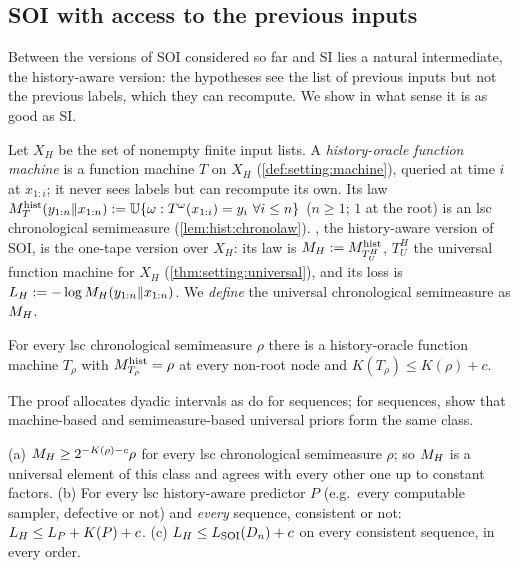 \subsection{SOI with access to the previous inputs}\label{sec:hist:sfihist}

Between the versions of SOI considered so far and SI lies a natural intermediate, the history-aware version: the hypotheses see the list of previous inputs but not the previous labels, which they can recompute. We show in what sense it is as good as SI.

\begin{definition}[\SFIhist]\label{def:hist:sfihist}
Let $X_H$ be the set of nonempty finite input lists. A \emph{history-oracle function machine} is a function machine $T$ on $X_H$ (\cref{def:setting:machine}), queried at time $i$ at $x_{1:i}$; it never sees labels but can recompute its own. Its law $M^{\rm hist}_T(y_{1:n}\Vert x_{1:n}):=\mathbb{U}\{\omega:T^\omega(x_{1:i})=y_i\ \forall i\le n\}$ ($n\ge1$; $1$ at the root) is an lsc chronological semimeasure (\cref{lem:hist:chronolaw}). \emph{\SFIhist{}}, the history-aware version of SOI, is the one-tape version over $X_H$: its law is $M_{H}:=M^{\rm hist}_{T^H_U}$, $T^H_U$ the universal function machine for $X_H$ (\cref{thm:setting:universal}), and its loss is $L_{H}:=-\log M_{H}(y_{1:n}\Vert x_{1:n})$. We \emph{define} the universal chronological semimeasure as $M_{H}$.
\end{definition}

\begin{theorem}[Representation]\label{thm:hist:representation}
For every lsc chronological semimeasure $\rho$ there is a history-oracle function machine $T_\rho$ with $M^{\rm hist}_{T_\rho}=\rho$ at every non-root node and $K(T_\rho)\le K(\rho)+c$.
\end{theorem}

The proof allocates dyadic intervals as \citet{zvonkin1970complexity} do for sequences; for sequences, \citet{wood2013non} show that machine-based and semimeasure-based universal priors form the same class.

\begin{corollary}\label{cor:hist:H4}
(a) $M_{H}\ge2^{-K(\rho)-c}\rho$ for every lsc chronological semimeasure $\rho$; so $M_{H}$ is a universal element of this class and agrees with every other one up to constant factors.
(b) For every lsc history-aware predictor $P$ (e.g.\ every computable sampler, defective or not) and \emph{every} sequence, consistent or not: $L_{H}\le L_P+K(P)+c$.
(c) $L_{H}\le L_{\mathrm{SOI}}(D_n)+c$ on every consistent sequence, in every order.
\end{corollary}

